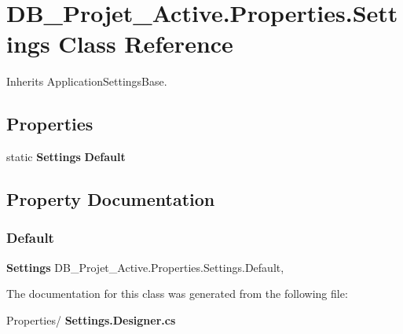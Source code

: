 \section{D\+B\+\_\+\+Projet\+\_\+\+Active.\+Properties.\+Settings Class Reference}
\label{class_d_b___projet___active_1_1_properties_1_1_settings}


Inherits Application\+Settings\+Base.

\subsection*{Properties}
\begin{DoxyCompactItemize}
\item 
static \textbf{ Settings} \textbf{ Default}\hspace{0.3cm}{\ttfamily  [get]}
\end{DoxyCompactItemize}


\subsection{Property Documentation}
\mbox{\label{class_d_b___projet___active_1_1_properties_1_1_settings_af88ae2bee5f04d17b21f62ae0bed02a6}} 
\subsubsection{Default}
{\footnotesize\ttfamily \textbf{ Settings} D\+B\+\_\+\+Projet\+\_\+\+Active.\+Properties.\+Settings.\+Default\hspace{0.3cm}{\ttfamily [static]}, {\ttfamily [get]}}



The documentation for this class was generated from the following file\+:\begin{DoxyCompactItemize}
\item 
Properties/\textbf{ Settings.\+Designer.\+cs}\end{DoxyCompactItemize}
